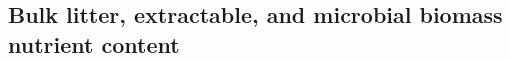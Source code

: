 \documentclass[authoryear,preprint,review,12pt]{elsarticle}
\begin{document}
                                                                                                                                                                                                                                                                                                                                                                                                                                                                                                                                                                                                                                                                                                                                                                                                                                                                                                                                                                                                                                                                                                                                                                                                                                                                                                                                                                                                                                                                                                                                        \subsection{Bulk litter, extractable, and microbial biomass nutrient content}
\end{document}
